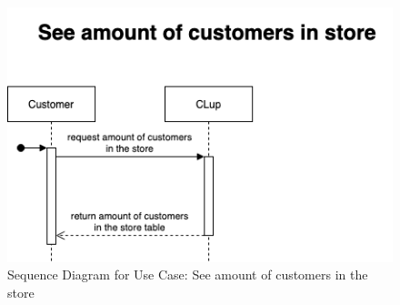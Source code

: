 \begin{figure}[H]
    \centering
    \includegraphics[height=0.5\textwidth]{Images/SequenceDiagrams/Customer/SeeAmountOfCustomersInStoreUseCaseSequenceDiagram.png}
    \caption{Sequence Diagram for Use Case: See amount of customers in the store}
\end{figure}

